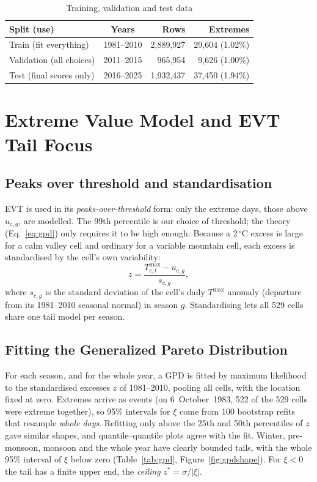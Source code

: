 \documentclass[12pt,a4paper]{report}
\begin{document}
\begin{table}[H]
\centering
\caption{Training, validation and test data}
\label{tab:splits}
\small
\begin{tabular}{|l|c|r|r|}
\hline
\textbf{Split (use)} & \textbf{Years} & \textbf{Rows} & \textbf{Extremes}\\ \hline
Train (fit everything) & 1981--2010 & 2{,}889{,}927 & 29{,}604 (1.02\%) \\ \hline
Validation (all choices) & 2011--2015 & 965{,}954 & 9{,}626 (1.00\%) \\ \hline
Test (final scores only) & 2016--2025 & 1{,}932{,}437 & 37{,}450 (1.94\%) \\ \hline
\end{tabular}
\end{table}

\section{Extreme Value Model and EVT Tail Focus}
\label{sec:evtmodel}
\subsection{Peaks over threshold and standardisation}
EVT is used in its \emph{peaks-over-threshold} form: only the extreme days, those above $u_{c,g}$, are modelled. The
99th percentile is our choice of threshold; the theory (Eq.~\ref{eq:gpd}) only requires it to be high enough. Because a
2\,$^\circ$C excess is large for a calm valley cell and ordinary for a variable mountain cell, each excess is
standardised by the cell's own variability:
\begin{equation}
  z=\frac{T^{\max}_{c,t}-u_{c,g}}{s_{c,g}},
  \label{eq:z}
\end{equation}
where $s_{c,g}$ is the standard deviation of the cell's daily $T^{\max}$ anomaly (departure from its 1981--2010
seasonal normal) in season $g$. Standardising lets all 529 cells share one tail model per season.

\subsection{Fitting the Generalized Pareto Distribution}
For each season, and for the whole year, a GPD is fitted by maximum likelihood to the standardised excesses $z$ of
1981--2010, pooling all cells, with the location fixed at zero. Extremes arrive as events (on 6~October~1983, 522 of the
529 cells were extreme together), so 95\% intervals for $\xi$ come from 100 bootstrap refits that resample
\emph{whole days}. Refitting only above the 25th and 50th percentiles of $z$ gave similar shapes, and quantile--quantile
plots agree with the fit. Winter, pre-monsoon, monsoon and the whole year have clearly bounded tails, with the whole 95\% interval of $\xi$
below zero (Table~\ref{tab:gpd}, Figure~\ref{fig:gpdshape}). For $\xi<0$ the tail has a finite upper end, the
\emph{ceiling} $z^{*}=\sigma/|\xi|$.
\end{document}
